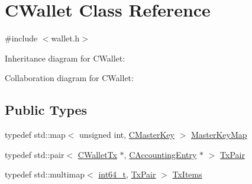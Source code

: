 \hypertarget{class_c_wallet}{}\section{C\+Wallet Class Reference}
\label{class_c_wallet}


{\ttfamily \#include $<$wallet.\+h$>$}



Inheritance diagram for C\+Wallet\+:


Collaboration diagram for C\+Wallet\+:
\subsection*{Public Types}
\begin{DoxyCompactItemize}
\item 
typedef std\+::map$<$ unsigned int, \hyperlink{class_c_master_key}{C\+Master\+Key} $>$ \hyperlink{class_c_wallet_a0e21167a320a0ab8f15d0e11c6749a0e}{Master\+Key\+Map}
\item 
typedef std\+::pair$<$ \hyperlink{class_c_wallet_tx}{C\+Wallet\+Tx} $\ast$, \hyperlink{class_c_accounting_entry}{C\+Accounting\+Entry} $\ast$ $>$ \hyperlink{class_c_wallet_ad1557a7d200f70bc97319376a24c98a7}{Tx\+Pair}
\item 
typedef std\+::multimap$<$ \hyperlink{stdint_8h_adec1df1b8b51cb32b77e5b86fff46471}{int64\+\_\+t}, \hyperlink{class_c_wallet_ad1557a7d200f70bc97319376a24c98a7}{Tx\+Pair} $>$ \hyperlink{class_c_wallet_ac35fb148c0967ad24db292435b54ad85}{Tx\+Items}
\end{DoxyCompactItemize}
